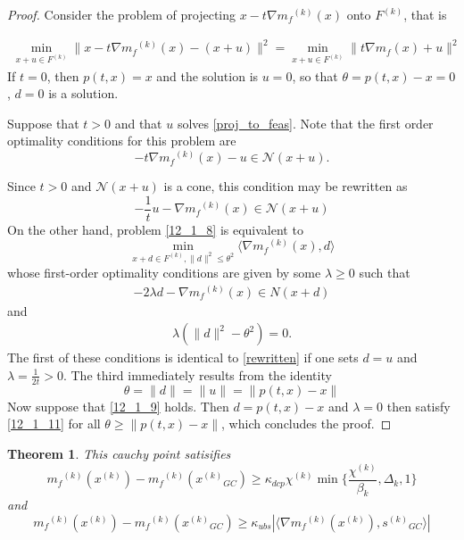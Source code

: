 \documentclass{article}
\newtheorem{theorem}{Theorem}[section]
\theoremstyle{case}
\newcommand{\modelk}{{{m}_f}^{(k)}}
\newcommand{\gradmodelk}{\nabla{{m}_f}^{(k)}}
\newcommand{\iteratek}{{x}^{(k)}}
\newcommand{\feasiblek}{{F}^{(k)}}
\newcommand{\ptx}{p(t,x)}
\newcommand{\gck}{{{x}^{(k)}}_{GC}}
\newcommand{\sgck}{{{s}^{(k)}}_{GC}}
\newcommand{\chik}{{\chi^{(k)}}}
\begin{document}
\begin{proof}
Consider the problem of projecting $x-t\nabla \modelk(x)$ onto $\feasiblek$, that is

\begin{align}
\label{proj_to_feas}
\min_{x+u \in \feasiblek} \|x-t\nabla \modelk(x) - (x + u) \|^2 = \min_{x+u\in \feasiblek}\|t\nabla m_f(x) + u\|^2
\end{align}
If $t=0$, then $\ptx = x$ and the solution is $u=0$, so that $\theta = \ptx-x = 0$, $d=0$ is a solution.

Suppose that $t>0$ and that $u$ solves \ref{proj_to_feas}.
Note that the first order optimality conditions for this problem are
\[
-t\nabla \modelk(x)-u \in \mathcal N (x+u).
\]

Since $t>0$ and $\mathcal N(x+u)$ is a cone, this condition may be rewritten as 
\[
\label{rewritten}
-\frac 1 t u -\nabla \modelk(x) \in \mathcal N(x+u)
\]
On the other hand, problem \ref{12_1_8} is equivalent to
\[\min_{x+d\in \feasiblek, \|d\|^2 \le \theta^2} \langle\nabla \modelk(x), d\rangle \]
whose first-order optimality conditions are given by some $\lambda \ge 0$ such that
\begin{align}
\label{12_1_11}
-2\lambda d-\nabla \modelk(x) \in N(x+d)
\end{align}
and
\begin{align}
\lambda(\|d\|^2-\theta^2) = 0.
\end{align}
The first of these conditions is identical to \ref{rewritten} if one sets $d=u$ and $\lambda=\frac 1 {2t}>0$.
The third immediately results from the identity 
\[
\theta=\|d\| = \|u\|=\|\ptx-x\|
\]
Now suppose that \ref{12_1_9} holds. Then $d=\ptx-x$ and $\lambda=0$ then satisfy \ref{12_1_11} for all $\theta \ge \|\ptx-x\|$, which concludes the proof.


\end{proof}





\begin{theorem}
This cauchy point satisifies
\[
\modelk(\iteratek) - \modelk(\gck) \ge \kappa_{dcp} \chik \min\{\frac{\chik}{\beta_k}, \Delta_k, 1\}
\]
and
\[
\label{12_2_6}
\modelk(\iteratek) - \modelk(\gck) \ge \kappa_{ubs}|\langle \gradmodelk(\iteratek), \sgck\rangle|
\]

\end{theorem}
\end{document}
